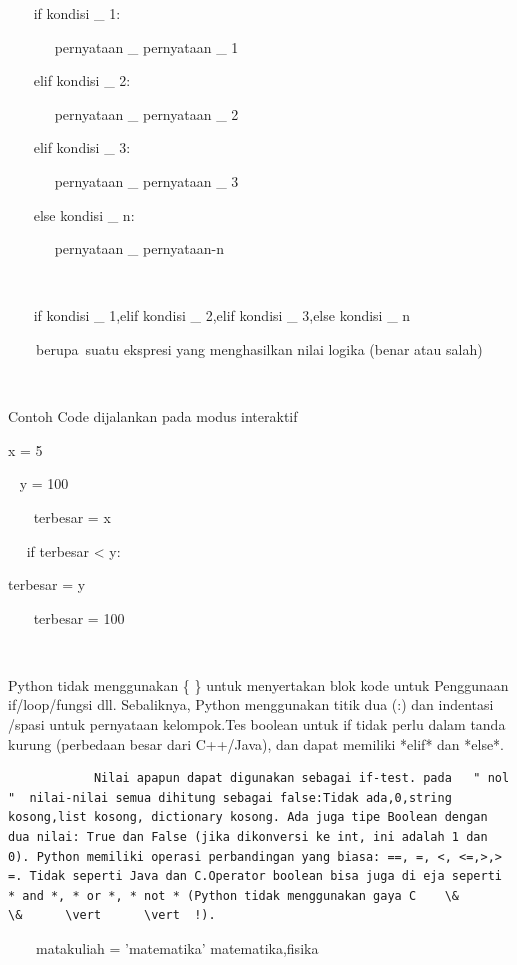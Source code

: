  
~~~ if kondisi   \_  1: 

 
~~~~~~ pernyataan   \_  pernyataan   \_  1 

 
~~~ elif kondisi   \_  2: 

 
~~~~~~ pernyataan   \_  pernyataan   \_  2 

 
~~~ elif kondisi   \_  3: 

 
~~~~~~ pernyataan   \_  pernyataan   \_  3 

 
~~~ else kondisi   \_  n: 

 
~~~~~~ pernyataan   \_  pernyataan-n 

 
~~~~~~  
 
~~~ if kondisi   \_  1,elif kondisi   \_  2,elif kondisi   \_  3,else kondisi   \_  n 

 
~~~~berupa~suatu ekspresi yang menghasilkan nilai logika (benar atau salah)    
 
~~~  
 
Contoh Code dijalankan pada modus interaktif 

 
  x = 5 

 
~ y = 100 

 
~~~ terbesar = x 

 
~~ if terbesar < y: 

 
terbesar = y 

~~~ terbesar = 100  

 
~~~  

 
   Python tidak menggunakan    \{     \}   untuk menyertakan blok kode untuk Penggunaan if/loop/fungsi dll. Sebaliknya, Python menggunakan titik dua (:) dan indentasi /spasi untuk pernyataan   kelompok.Tes   boolean untuk if tidak perlu dalam tanda kurung (perbedaan besar dari C++/Java), dan dapat memiliki *elif* dan *else*. 
 
\begin{verbatim}
            Nilai apapun dapat digunakan sebagai if-test. pada   " nol  "  nilai-nilai semua dihitung sebagai false:Tidak ada,0,string kosong,list kosong, dictionary kosong. Ada juga tipe Boolean dengan dua nilai: True dan False (jika dikonversi ke int, ini adalah 1 dan 0). Python memiliki operasi perbandingan yang biasa: ==, =, <, <=,>,> =. Tidak seperti Java dan C.Operator boolean bisa juga di eja seperti * and *, * or *, * not * (Python tidak menggunakan gaya C    \&      \&      \vert      \vert  !). 
\end{verbatim}
 
~~~~matakuliah = 'matematika'   matematika,fisika 
 
~~  
 
